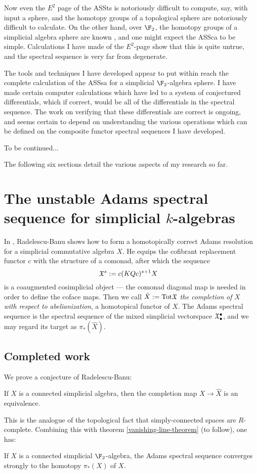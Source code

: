 \documentclass[11pt]{article}
\begin{document}
Now even the $E^2$ page of the ASSts is notoriously difficult to compute, say, with input a sphere, and the homotopy groups of a topological sphere are notoriously difficult to calculate. On the other hand, over $\F_2$, the homotopy groups of a simplicial algebra sphere are known \cite{DwyerHtpyOpsSimpComAlg.pdf}, and one might expect the ASSca to be simple. Calculations I have made of the $E^2$-page show that this is quite untrue, and the spectral sequence is very far from degenerate. 

The tools and techniques I have developed appear to put within reach the complete calculation of the ASSsa for a simplicial $\F_2$-algebra sphere. I have made certain computer calculations which have led to a system of conjectured differentials, which if correct, would be all of the differentials in the spectral sequence. The work on verifying that these differentials are correct is ongoing, and seems certain to depend on understanding the various operations which can be defined on the composite functor spectral sequences I have developed.

To be continued...


\textup{}

\noindent The following six sections detail the various aspects of my research so far.



\section{The unstable Adams spectral sequence for simplicial $k$-algebras}
In \cite{radelescuBanu.pdf}, Radelescu-Banu shows how to form a homotopically correct Adams resolution for a simplicial commutative algebra $X$. He equips the cofibrant replacement functor $c$ with the structure of a comonad, after which the sequence
\[\mathfrak{X}^s:=c(KQc)^{s+1}X\]
is a coaugmented cosimplicial object --- the comonad diagonal map is needed in order to define the coface maps. Then we call $\hat X:=\textup{Tot}\mathfrak{X}$ \emph{the completion of $X$ with respect to abelianization}, a homotopical functor of $X$. The Adams spectral sequence is the spectral sequence of the mixed simplicial vectorspace $\mathfrak{X}^\bullet_\bullet$, and we may regard its target as $\pi_*(\hat X)$.

\subsection{Completed work}
We prove a conjecture of Radelescu-Banu:
\begin{thm}
If $X$ is a connected simplicial algebra, then the completion map $X\to \hat X$ is an equivalence.
\end{thm}
This is the analogue of the topological fact that simply-connected spaces are $R$-complete. Combining this with theorem \ref{vanishing-line-theorem} (to follow), one has:
\begin{cor}
If $X$ is a connected simplicial $\F_2$-algebra, the Adams spectral sequence converges strongly to the homotopy $\pi_*(X)$ of $X$.
\end{cor}
\end{document}
